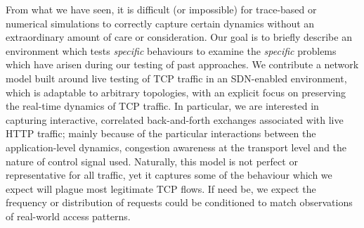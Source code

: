 \documentclass[conference, a4paper, 10pt, times]{IEEEtran}
\begin{document}
From what we have seen, it is difficult (or impossible) for trace-based or numerical simulations to correctly capture certain dynamics without an extraordinary amount of care or consideration.
Our goal is to briefly describe an environment which tests \emph{specific} behaviours to examine the \emph{specific} problems which have arisen during our testing of past approaches.
We contribute a network model built around live testing of TCP traffic in an SDN-enabled environment, which is adaptable to arbitrary topologies, with an explicit focus on preserving the real-time dynamics of TCP traffic.
In particular, we are interested in capturing interactive, correlated back-and-forth exchanges associated with live HTTP traffic; mainly because of the particular interactions between the application-level dynamics, congestion awareness at the transport level and the nature of control signal used.
Naturally, this model is not perfect or representative for all traffic, yet it captures some of the behaviour which we expect will plague most legitimate TCP flows.
If need be, we expect the frequency or distribution of requests could be conditioned to match observations of real-world access patterns.



\end{document}
